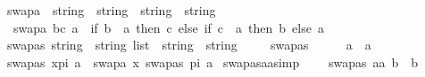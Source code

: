 %
\begin{isabellebody}%
%
%
\isadelimtheory
%
\endisadelimtheory
%
\isatagtheory
%
\endisatagtheory
{\isafoldtheory}%
%
\isadelimtheory
%
\endisadelimtheory
%
\isadelimdocument
%
\endisadelimdocument
%
\isatagdocument
%
\isamarkuptrue%
%
\endisatagdocument
{\isafolddocument}%
%
\isadelimdocument
%
\endisadelimdocument
{}\isamarkupfalse%
\ swapa\ {\isacharcolon}{\kern0pt}{\isacharcolon}{\kern0pt}\ {\isachardoublequoteopen}{\isacharparenleft}{\kern0pt}string\ {\isasymtimes}\ string{\isacharparenright}{\kern0pt}\ {\isasymRightarrow}\ string\ {\isasymRightarrow}\ string{\isachardoublequoteclose}\isanewline
\ \ \isanewline
\ \ {\isachardoublequoteopen}swapa\ {\isacharparenleft}{\kern0pt}b{\isacharcomma}{\kern0pt}c{\isacharparenright}{\kern0pt}\ a\ {\isacharequal}{\kern0pt}\ {\isacharparenleft}{\kern0pt}if\ b\ {\isacharequal}{\kern0pt}\ a\ then\ c\ else\ {\isacharparenleft}{\kern0pt}if\ c\ {\isacharequal}{\kern0pt}\ a\ then\ b\ else\ a{\isacharparenright}{\kern0pt}{\isacharparenright}{\kern0pt}{\isachardoublequoteclose}\isanewline
\isanewline
{}\isamarkupfalse%
\ swapas{\isacharcolon}{\kern0pt}{\isacharcolon}{\kern0pt}\ {\isachardoublequoteopen}{\isacharparenleft}{\kern0pt}string\ {\isasymtimes}\ string{\isacharparenright}{\kern0pt}\ list\ {\isasymRightarrow}\ string\ {\isasymRightarrow}\ string{\isachardoublequoteclose}\isanewline
\ \ \isanewline
\ \ {\isachardoublequoteopen}swapas\ {\isacharbrackleft}{\kern0pt}{\isacharbrackright}{\kern0pt}\ \ \ \ \ a\ {\isacharequal}{\kern0pt}\ a{\isachardoublequoteclose}\isanewline
{\isacharbar}{\kern0pt}\ {\isachardoublequoteopen}swapas\ {\isacharparenleft}{\kern0pt}x{\isacharhash}{\kern0pt}pi{\isacharparenright}{\kern0pt}\ a\ {\isacharequal}{\kern0pt}\ swapa\ x\ {\isacharparenleft}{\kern0pt}swapas\ pi\ a{\isacharparenright}{\kern0pt}{\isachardoublequoteclose}\isanewline
\isanewline
{}\isamarkupfalse%
\ swapas{\isacharunderscore}{\kern0pt}aa{\isacharbrackleft}{\kern0pt}simp{\isacharbrackright}{\kern0pt}{\isacharcolon}{\kern0pt}\ \isanewline
\ \ \ {\isachardoublequoteopen}swapas\ {\isacharbrackleft}{\kern0pt}{\isacharparenleft}{\kern0pt}a{\isacharcomma}{\kern0pt}a{\isacharparenright}{\kern0pt}{\isacharbrackright}{\kern0pt}\ b\ {\isacharequal}{\kern0pt}\ b{\isachardoublequoteclose}\isanewline
%
\isadelimproof
\ \ %
\endisadelimproof
%
\isatagproof
{}\isamarkupfalse%

\end{isabellebody}
